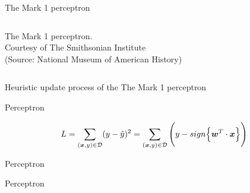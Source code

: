 \begin{frame}[t]{The Mark 1 perceptron}
\begin{columns}[t]
\begin{column}{0.50\textwidth}
\begin{center}
                {\tiny 
                The Mark 1 perceptron.\\
                \color{col:attribution} 
                Courtesy of The Smithsonian Institute\\ (Source: National Museum of American History)\\}
             \end{center}
        \end{column}
        \begin{column}{0.20\textwidth}
        \end{column}
      \end{columns}

\end{frame}

%
%
%

\begin{frame}[t]{Heuristic update process of the The Mark 1 perceptron}

\end{frame}

%
%
%

\begin{frame}[t]{Perceptron}

    \begin{equation}
        L = \sum_{(\boldsymbol{x},y) \in \mathcal{D}} (y - \hat{y})^2 
          = \sum_{(\boldsymbol{x},y) \in \mathcal{D}} \Bigg(y - sign\Big\{ \boldsymbol{w}^T \cdot \boldsymbol{x} \Big\}\Bigg)
     \end{equation}


\end{frame}

%
%
%

\begin{frame}[t]{Perceptron}

\end{frame}

%
%
%

\begin{frame}[t]{Perceptron}

\end{frame}
